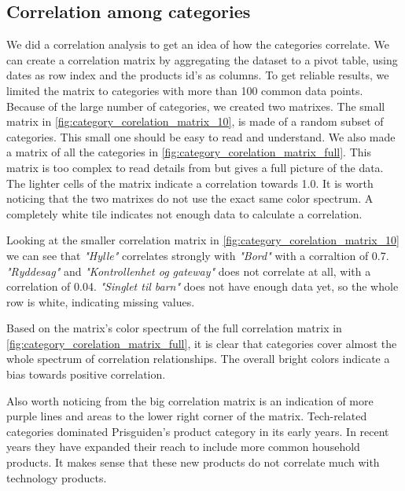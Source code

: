 \subsection{Correlation among categories}
We did a correlation analysis to get an idea of how the categories correlate.
We can create a correlation matrix by aggregating the dataset to a pivot table, using dates as row index and the products id's as columns.
To get reliable results, we limited the matrix to categories with more than 100 common data points.
Because of the large number of categories, we created two matrixes. The small matrix in \autoref{fig:category_corelation_matrix_10},
is made of a random subset of categories.
This small one should be easy to read and understand.
We also made a matrix of all the categories in \autoref{fig:category_corelation_matrix_full}. This matrix is too complex to read details from but gives a full picture of the data.
The lighter cells of the matrix indicate a correlation towards 1.0. It is worth noticing that the two matrixes do not use the exact same color spectrum.
A completely white tile indicates not enough data to calculate a correlation.

Looking at the smaller correlation matrix in \autoref{fig:category_corelation_matrix_10} we can see that
\textit{"Hylle"} correlates strongly  with \textit{"Bord"} with a corraltion of 0.7.
\textit{"Ryddesag"} and \textit{"Kontrollenhet og gateway"} does not correlate at all, with a correlation of 0.04.
\textit{"Singlet til barn"} does not have enough data yet, so the whole row is white, indicating missing values.


Based on the matrix's color spectrum of the full correlation matrix in \autoref{fig:category_corelation_matrix_full}, it is clear that categories cover almost the whole spectrum of correlation relationships.
The overall bright colors indicate a bias towards positive correlation.

Also worth noticing from the big correlation matrix is an indication of more purple lines and areas to the lower right corner of the matrix.
Tech-related categories dominated Prisguiden's product category in its early years. In recent years they have expanded their reach to include more common household
products. It makes sense that these new products do not correlate much with technology products.

